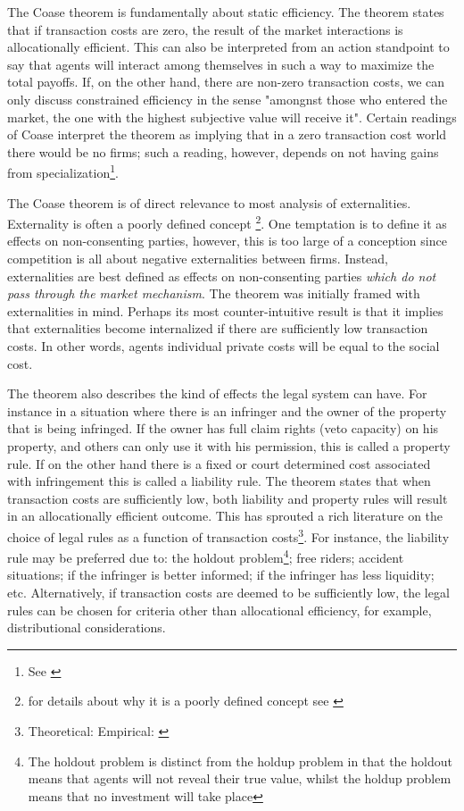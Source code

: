 The Coase theorem is fundamentally about static efficiency. The theorem states that if transaction costs are zero, the result of the market interactions is allocationally efficient. This can also be interpreted from an action standpoint to say that agents will interact among themselves in such a way to maximize the total payoffs. If, on the other hand, there are non-zero transaction costs, we can only discuss constrained efficiency in the sense "amongnst those who entered the market, the one with the highest subjective value will receive it". Certain readings of Coase interpret the theorem  as implying that in a zero transaction cost world there would be no firms; such a reading, however, depends on not having gains from specialization\footnote{See \cite{demsetz2011rh}}.

The Coase theorem is of direct relevance to most analysis of externalities. Externality is often a poorly defined concept \footnote{for details about why it is a poorly defined concept see \cite{Cheung1970}}. One temptation is to define it as effects on non-consenting parties, however, this is too large of a conception since competition is all about negative externalities between firms. Instead, externalities are best defined as effects on non-consenting parties \textit{which do not pass through the market mechanism}. The theorem was initially framed with externalities in mind. Perhaps its most counter-intuitive result is that it implies that externalities become internalized if there are sufficiently low transaction costs. In other words, agents individual private costs will be equal to the social cost.

The theorem also describes the kind of effects the legal system can have. For instance in a situation where there is an infringer and the owner of the property that is being infringed. If the owner has full claim rights (veto capacity) on his property, and others can only use it with his permission, this is called a property rule. If on the other hand there is a fixed or court determined cost associated with infringement this is called a liability rule. The theorem states that when transaction costs are sufficiently low, both liability and property rules will result in an allocationally efficient outcome. This has sprouted a rich literature on the choice of legal rules as a function of transaction costs\footnote{Theoretical: \cite{calabresi1972property} Empirical: \cite{kaplow1995property}}. For instance, the liability rule may be preferred due to: the holdout problem\footnote{The holdout problem is distinct from the holdup problem in that the holdout means that agents will not reveal their true value, whilst the holdup problem means that no investment will take place}; free riders; accident situations; if the infringer is better informed; if the infringer has less liquidity; etc. Alternatively, if transaction costs are deemed to be sufficiently low, the legal rules can be chosen for criteria other than allocational efficiency, for example, distributional considerations.


